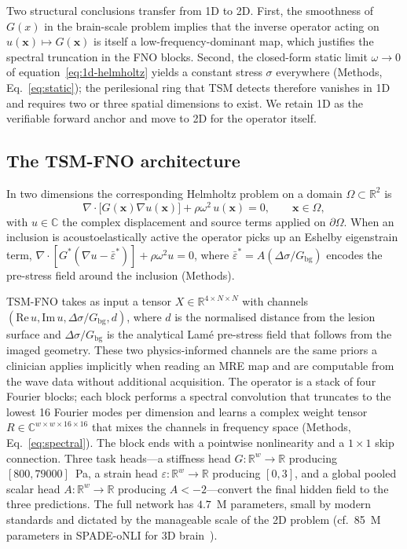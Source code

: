 \documentclass[11pt,letterpaper]{article}
\newcommand{\R}{\mathbb{R}}
\newcommand{\C}{\mathbb{C}}
\newcommand{\xvec}{\bm{x}}
\newcommand{\Gbg}{G_{\mathrm{bg}}}
\newcommand{\eps}{\varepsilon}
\newcommand{\Dsig}{\Delta\sigma}
\begin{document}
Two structural conclusions transfer from 1D to 2D. First, the smoothness
of $G(x)$ in the brain-scale problem implies that the inverse operator
acting on $u(\xvec)\!\mapsto\! G(\xvec)$ is itself a low-frequency-dominant
map, which justifies the spectral truncation in the FNO blocks. Second,
the closed-form static limit $\omega\!\to\!0$ of
equation~\eqref{eq:1d-helmholtz} yields a constant stress $\sigma$
everywhere (Methods, Eq.~\eqref{eq:static}); the perilesional ring that
TSM detects therefore vanishes in 1D and requires two or three spatial
dimensions to exist. We retain 1D as the verifiable forward anchor and
move to 2D for the operator itself.

\subsection*{The TSM-FNO architecture}

In two dimensions the corresponding Helmholtz problem on a
domain $\Omega\subset\R^{2}$ is
\begin{equation}
\nabla\!\cdot\!\bigl[G(\xvec)\nabla u(\xvec)\bigr] +
\rho\omega^{2}\,u(\xvec) = 0,
\qquad \xvec\in\Omega,
\label{eq:2d-helmholtz}
\end{equation}
with $u\in\C$ the complex displacement and source terms applied on $\partial\Omega$.
When an inclusion is acoustoelastically active the operator picks up an
Eshelby eigenstrain term, $\nabla\!\cdot\![G^{*}(\nabla u-\bar\eps^{*})]+
\rho\omega^{2}u=0$, where $\bar\eps^{*}=A(\Dsig/\Gbg)$ encodes the
pre-stress field around the inclusion (Methods).

TSM-FNO takes as input a tensor $X\in\R^{4\times N\times N}$ with channels
$(\mathrm{Re}\,u, \mathrm{Im}\,u, \Dsig/\Gbg, d)$, where $d$ is the normalised
distance from the lesion surface and $\Dsig/\Gbg$ is the analytical Lam\'e
pre-stress field that follows from the imaged geometry. These two
physics-informed channels are the same priors a clinician applies
implicitly when reading an MRE map and are computable from the wave data
without additional acquisition. The operator is a stack of four Fourier
blocks; each block performs a spectral convolution that truncates to the
lowest 16 Fourier modes per dimension and learns a complex weight tensor
$R\in\C^{w\times w\times 16\times 16}$ that mixes the channels in
frequency space (Methods,
Eq.~\eqref{eq:spectral}). The block ends with a pointwise nonlinearity and
a $1\!\times\!1$ skip connection. Three task heads---a stiffness head
$G\!:\!\R^{w}\!\to\!\R$ producing $[800,79000]$~Pa, a strain head
$\eps\!:\!\R^{w}\!\to\!\R$ producing $[0,3]$, and a global pooled scalar
head $A\!:\!\R^{w}\!\to\!\R$ producing $A<-2$---convert the final hidden
field to the three predictions. The full network has $4.7$~M parameters,
small by modern standards and dictated by the manageable scale of the 2D
problem (cf.\ 85~M parameters in SPADE-oNLI for 3D
brain~\cite{herasrivera2025onli}).
\end{document}
